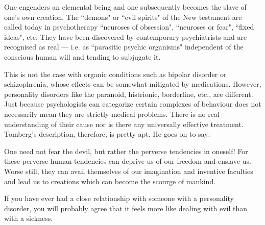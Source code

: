 \begin{quotex}
One engenders an elemental being and one subsequently becomes the slave of one's own creation. The ``demons" or ``evil spirits" of the New testament are called today in psychotherapy ``neuroses of obsession", ``neuroses or fear", ``fixed ideas", etc. They have been discovered by contemporary psychiatrists and are recognised as real — i.e. as ``parasitic psychic organisms" independent of the conscious human will and tending to subjugate it.

\end{quotex}
This is not the case with organic conditions such as bipolar disorder or schizophrenia, whose effects can be somewhat mitigated by medications. However, personality disorders like the paranoid, histrionic, borderline, etc., are different. Just because psychologists can categorize certain complexes of behaviour does not necessarily mean they are strictly medical problems. There is no real understanding of their cause nor is there any universally effective treatment. Tomberg's description, therefore, is pretty apt. He goes on to say:

\begin{quotex}
One need not fear the devil, but rather the perverse tendencies in oneself! For these perverse human tendencies can deprive us of our freedom and enslave us. Worse still, they can avail themselves of our imagination and inventive faculties and lead us to creations which can become the scourge of mankind.

\end{quotex}
If you have ever had a close relationship with someone with a personality disorder, you will probably agree that it feels more like dealing with evil than with a sickness.



